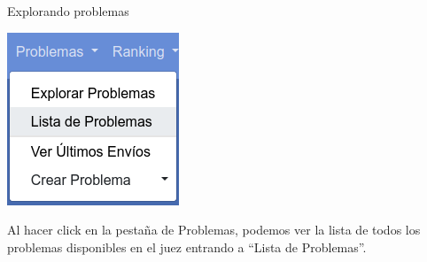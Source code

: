 \documentclass{beamer}
\begin{document}
    \begin{frame}{Explorando problemas}
        \begin{minipage}{.35\linewidth}
            \includegraphics[width=.9\linewidth]{./res/ou_problem_bar.png}
        \end{minipage}\pause
        \begin{minipage}{.64\linewidth}
            Al hacer click en la pestaña de Problemas, podemos ver la lista de todos los problemas disponibles en el juez entrando a ``Lista de Problemas''.
        \end{minipage}
    \end{frame}
\end{document}
